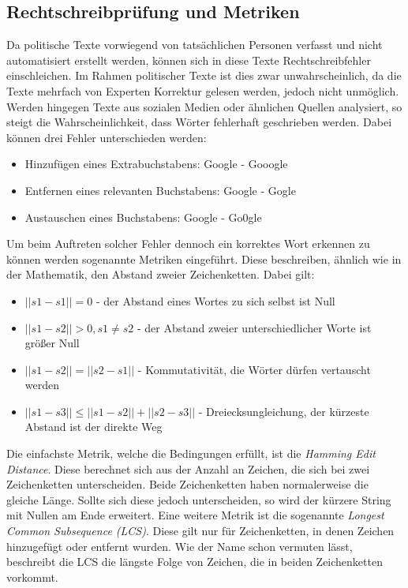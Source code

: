 \subsection{Rechtschreibprüfung und Metriken}
Da politische Texte vorwiegend von tatsächlichen Personen verfasst und nicht automatisiert erstellt werden, können sich in diese Texte Rechtschreibfehler einschleichen. Im Rahmen politischer Texte ist dies zwar unwahrscheinlich, da die Texte mehrfach von Experten Korrektur gelesen werden, jedoch nicht unmöglich. Werden hingegen Texte aus sozialen Medien oder ähnlichen Quellen analysiert, so steigt die Wahrscheinlichkeit, dass Wörter fehlerhaft geschrieben werden. Dabei können drei Fehler unterschieden werden:
\begin{itemize}
\item Hinzufügen eines Extrabuchstabens: Google - Gooogle
\item Entfernen eines relevanten Buchstabens: Google - Gogle
\item Austauschen eines Buchstabens: Google - Go0gle
\end{itemize}
Um beim Auftreten solcher Fehler dennoch ein korrektes Wort erkennen zu können werden sogenannte Metriken eingeführt. Diese beschreiben, ähnlich wie in der Mathematik, den Abstand zweier Zeichenketten. Dabei gilt:
\begin{itemize}
\item \( ||s1 - s1|| = 0 \) - der Abstand eines Wortes zu sich selbst ist Null
\item \( ||s1 - s2|| > 0, s1 \neq s2 \) - der Abstand zweier unterschiedlicher Worte ist größer Null
\item \( ||s1 - s2|| = ||s2 - s1|| \) - Kommutativität, die Wörter dürfen vertauscht werden
\item \( ||s1 - s3|| \leq ||s1 - s2|| + ||s2 - s3|| \) - Dreiecksungleichung, der kürzeste Abstand ist der direkte Weg
\end{itemize}
Die einfachste Metrik, welche die Bedingungen erfüllt, ist die \textit{Hamming Edit Distance}. Diese berechnet sich aus der Anzahl an Zeichen, die sich bei zwei Zeichenketten unterscheiden. Beide Zeichenketten haben normalerweise die gleiche Länge. Sollte sich diese jedoch unterscheiden, so wird der kürzere String mit Nullen am Ende erweitert.
\newline
Eine weitere Metrik ist die sogenannte \textit{Longest Common Subsequence (LCS)}. Diese gilt nur für Zeichenketten, in denen Zeichen hinzugefügt oder entfernt wurden. Wie der Name schon vermuten lässt, beschreibt die LCS die längste Folge von Zeichen, die in beiden Zeichenketten vorkommt.
